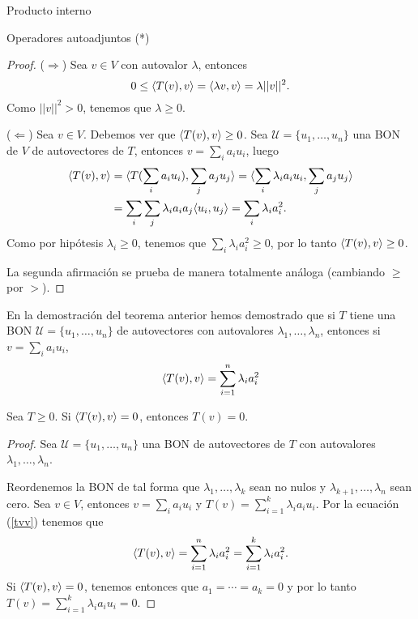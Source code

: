 \begin{chapter}{Producto interno}
\begin{section}{Operadores autoadjuntos (*)}
\begin{proof}
            ($\Rightarrow$) Sea $v \in V$ con autovalor $\lambda$, entonces
            $$
            0 \le \langle T(v),v \rangle = \langle \lambda v,v \rangle = \lambda ||v||^2.  
            $$
            Como $||v||^2 > 0$, tenemos que $\lambda \ge 0$.
            
            
            ($\Leftarrow$) Sea $v \in V$. Debemos ver que $ \langle T(v),v \rangle \ge 0$.  Sea $\mathcal{U} = \{u_1,\ldots,u_n\}$  una BON de $V$ de autovectores de $T$, entonces $v = \sum_i a_i u_i$, luego
            \begin{align*}
                \langle T(v),v \rangle  &=  \langle T(\sum_i a_i u_i),\sum_j a_j u_j \rangle =  \langle \sum_i \lambda_i a_i u_i,\sum_j a_j u_j \rangle \\ 
                &=  \sum_i\sum_j\lambda_i a_ia_j\langle  u_i,  u_j \rangle = \sum_i\lambda_i a_i^2.    
            \end{align*}
            Como por hipótesis $\lambda_i \ge 0$, tenemos que $\sum_i\lambda_i a_i^2\ge 0$, por lo tanto $ \langle T(v),v \rangle \ge 0$.
            
            La segunda afirmación se prueba de manera totalmente análoga (cambiando $\ge$ por $>$).
        \end{proof}
        
        \begin{obs*}
            En la demostración del teorema anterior hemos demostrado  que si $T$ tiene una BON $\mathcal{U} = \{u_1,\ldots,u_n\}$ de autovectores con  autovalores $\lambda_1,\ldots,\lambda_n$, entonces si 
            $v = \sum_i a_i u_i$, 
            \begin{equation}\label{tvv}
            \langle T(v),v \rangle  =  \sum_{i=1}^n\lambda_i a_i^2
            \end{equation} 
        \end{obs*}
        
        
        \begin{corolario}\label{coro1} 
         Sea $T \ge 0$. Si $\langle T(v), v \rangle = 0$, entonces $T(v)=0$.
        \end{corolario}
        \begin{proof}
            Sea $\mathcal{U} = \{u_1,\ldots,u_n\}$ una BON de autovectores de $T$  con  autovalores $\lambda_1,\ldots,\lambda_n$.
            
            Reordenemos la BON de tal forma que $\lambda_1,\ldots,\lambda_k$ sean no nulos y   $\lambda_{k+1},\ldots,\lambda_n$ sean cero. Sea $v \in V$, entonces $v = \sum_i a_i u_i$ y $T(v) = \sum_{i=1}^k \lambda_ia_i u_i$.  Por la ecuación (\ref{tvv}) tenemos  que 
            $$
            \langle T(v),v \rangle  = \sum_{i=1}^n\lambda_i a_i^2 = \sum_{i=1}^k\lambda_i a_i^2.
            $$
            Si $\langle T(v),v \rangle  = 0$, tenemos entonces que $a_1= \cdots=a_k =0$ y por lo tanto $T(v) = \sum_{i=1}^k \lambda_ia_i u_i = 0$.
            

\end{proof}
\end{section}
\end{chapter}
